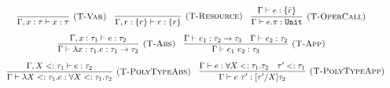 \documentclass{llncs}
\newcommand{\keywadj}[1]{\mathtt{#1}}
\newcommand{\keyw}[1]{\keywadj{#1}~}
\newcommand{\kw}[1]{\keyw{ #1 }}
\newcommand{\kwa}[1]{\keywadj{ #1 }}
\begin{document}
\[
\begin{array}{c}


\infer[\textsc{(T-Var)}]
	{\Gamma, x: \tau \vdash x: \tau}
	{}
~~~
\infer[\textsc{(T-Resource)}]
	{\Gamma, r: \{ r \} \vdash r : \{ r \}}
	{}

~~~

\infer[\textsc{(T-OperCall)}]
	{\Gamma \vdash e.\pi: \kwa{Unit}}
	{\Gamma \vdash e: \{ \bar r \}} \\[2ex]
\infer[\textsc{(T-Abs)}]
	{\Gamma \vdash \lambda x: \tau_1.e : \tau_1 \rightarrow \tau_2}
	{\Gamma, x: \tau_1 \vdash e: \tau_2}
~~~

\infer[\textsc{(T-App)}]
	{\Gamma \vdash e_1~e_2: \tau_3}
	{\Gamma \vdash e_1: \tau_2 \rightarrow \tau_3 & \Gamma \vdash e_2: \tau_2}\\[2ex]
~~~
\infer[\textsc{(T-PolyTypeAbs)}]
	{\Gamma \vdash \lambda X <: \tau_1. e : \forall X <: \tau_1. \tau_2}
	{\Gamma, X <: \tau_1 \vdash e: \tau_2 }
~~~
\infer[\textsc{(T-PolyTypeApp)}]
	{\Gamma \vdash e~\tau' : [\tau'/X]\tau_2}
	{\Gamma \vdash e: \forall X <: \tau_1.\tau_2  & \tau' <: \tau_1  }

\end{array}
\]


















\noindent
\fbox{$\hat \Gamma \vdash \hat e: \hat \tau~\kw{with} \varepsilon$}
\end{document}
